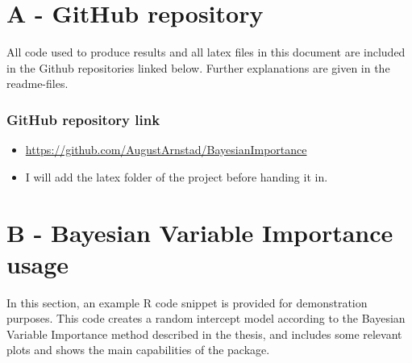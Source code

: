

\chapter*{A - GitHub repository}

All code used to produce results and all latex files in this document are included in the Github repositories linked below. Further explanations are given in the readme-files. 
\subsection*{GitHub repository link}
\begin{itemize}
    \item \url{https://github.com/AugustArnstad/BayesianImportance}
    \item I will add the latex folder of the project before handing it in.
\end{itemize}






\chapter*{B - Bayesian Variable Importance usage}

In this section, an example R code snippet is provided for demonstration purposes. This code creates a random intercept model according to the Bayesian Variable Importance method described in the thesis, and includes some relevant plots and shows the main capabilities of the package. 

